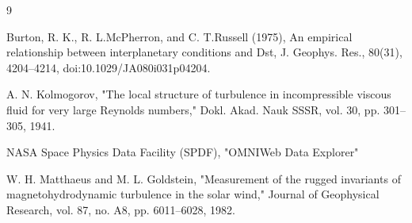 \documentclass[12pt]{article}
\begin{document}
\begin{thebibliography}{9}

Burton, R. K., R. L.McPherron, and C. T.Russell (1975), An empirical relationship between interplanetary conditions and Dst, J. Geophys. Res., 80(31), 4204–4214, doi:10.1029/JA080i031p04204.

A. N. Kolmogorov,
"The local structure of turbulence in incompressible viscous fluid for very large Reynolds numbers,"
Dokl. Akad. Nauk SSSR, vol. 30, pp. 301--305, 1941.

NASA Space Physics Data Facility (SPDF), 
"OMNIWeb Data Explorer" 

W. H. Matthaeus and M. L. Goldstein, 
"Measurement of the rugged invariants of magnetohydrodynamic turbulence in the solar wind," 
Journal of Geophysical Research, vol. 87, no. A8, pp. 6011–6028, 1982.


\end{thebibliography}
\end{document}
